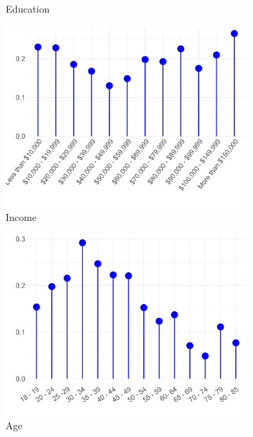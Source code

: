 \documentclass[12pt]{article}
\begin{document}
\begin{figure}[ht!]
\begin{subfigure}[b]{0.3\textwidth}
            \caption{Education}
            \label{fig:cat-tol-edu}
    \end{subfigure}
     \begin{subfigure}[b]{0.3\textwidth}
        \includegraphics[width=1.0\textwidth]{Plots/uni-dist-cat-tol-inc.png}
            \caption{Income}
            \label{fig:cat-tol-inc}
    \end{subfigure}
     \begin{subfigure}[b]{0.3\textwidth}
        \includegraphics[width=1.0\textwidth]{Plots/uni-dist-cat-tol-age.png}
            \caption{Age}
            \label{fig:cat-tol-age}
    \end{subfigure}
     \begin{subfigure}[b]{0.3\textwidth}

\end{subfigure}
\end{figure}
\end{document}
